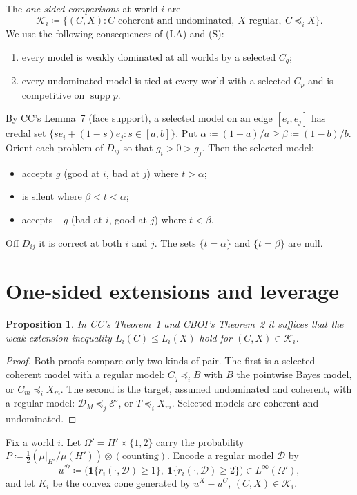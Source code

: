 \documentclass[11pt]{article}
\newtheorem{proposition}[theorem]{Proposition}
\theoremstyle{remark}\newtheorem{remark}[theorem]{Remark}
\newcommand{\Dscr}{\mathcal D}
\newcommand{\Escr}{\mathcal E}
\newcommand{\Kscr}{\mathcal K}
\newcommand{\supp}{\operatorname{supp}}
\newcommand{\one}{\mathbf 1}
\begin{document}
The \emph{one-sided comparisons} at world $i$ are
\[
 \Kscr_i\coloneqq\{(C,X):C\text{ coherent and undominated},\ X\text{ regular},\
 C\preceq_iX\}.
\]
We use the following consequences of (LA) and (S):
\begin{enumerate}[label=(KKM\alph*),leftmargin=*]
\item every model is weakly dominated at all worlds by a selected $C_q$;
\item every undominated model is tied at every world with a selected $C_p$
and is competitive on $\supp p$.
\end{enumerate}
By CC's Lemma~7 (face support), a selected model on an edge $[e_i,e_j]$ has
credal set $\{se_i+(1-s)e_j:s\in[a,b]\}$. Put
$\alpha\coloneqq(1-a)/a\ge\beta\coloneqq(1-b)/b$. Orient each problem of
$D_{ij}$ so that $g_i>0>g_j$. Then the selected model:
\begin{itemize}[leftmargin=*,itemsep=1pt]
\item accepts $g$ (good at $i$, bad at $j$) where $t>\alpha$;
\item is silent where $\beta<t<\alpha$;
\item accepts $-g$ (bad at $i$, good at $j$) where $t<\beta$.
\end{itemize}
Off $D_{ij}$ it is correct at both $i$ and $j$. The sets $\{t=\alpha\}$ and
$\{t=\beta\}$ are null.

\section{One-sided extensions and leverage}

\begin{proposition}\label{prop:one-sided}
In CC's Theorem~1 and CBOI's Theorem~2 it suffices that the weak extension
inequality $L_i(C)\le L_i(X)$ hold for $(C,X)\in\Kscr_i$.
\end{proposition}
\begin{proof}
Both proofs compare only two kinds of pair. The first is a selected coherent
model with a regular model: $C_q\preceq_iB$ with $B$ the pointwise Bayes
model, or $C_m\preceq_iX_m$. The second is the target, assumed undominated and
coherent, with a regular model: $\Dscr_M\preceq_j\Escr^\circ$, or
$T\preceq_iX_m$. Selected models are coherent and undominated.
\end{proof}

Fix a world $i$. Let $\Omega'=H'\times\{1,2\}$ carry the probability
$P\coloneqq\frac12(\mu|_{H'}/\mu(H'))\otimes(\text{counting})$. Encode a
regular model $\Dscr$ by
\[
 u^\Dscr\coloneqq\bigl(\one\{r_i(\cdot,\Dscr)\ge1\},\ \one\{r_i(\cdot,\Dscr)\ge2\}\bigr)
 \in L^\infty(\Omega'),
\]
and let $K_i$ be the convex cone generated by $u^X-u^C$, $(C,X)\in\Kscr_i$.
\end{document}
